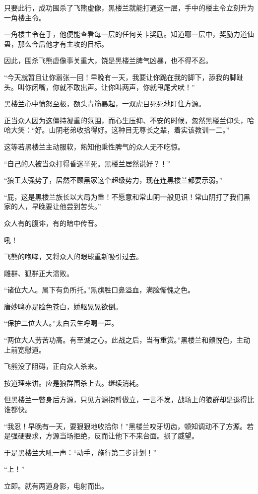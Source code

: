 \begin{this_body}
只要此行，成功围杀了飞熊虚像，黑楼兰就能打通这一层，手中的楼主令立刻升为一角楼主令。

一角楼主令在手，他便能查看每一层的任何关卡奖励。知道哪一层中，奖励力道仙蛊，那么今后他才有主攻的目标。

因此，围杀飞熊虚像事关重大，饶是黑楼兰脾气凶暴，也不得不忍。

“今天就暂且让你嚣张一回！早晚有一天，我要让你跪在我的脚下，舔我的脚趾头。叫你闭嘴，你就不敢出声。让你叫两声，你就甩尾犬吠！”

黑楼兰心中愤怒至极，额头青筋暴起，一双虎目死死地盯住方源。

正当众人因为这僵持凝重的氛围，而心生压抑、不安的时候，忽然黑楼兰仰头，哈哈大笑：“好。山阴老弟收拾得好。这种目无尊长之辈，着实该教训一二。”

这等若黑楼兰主动服软，熟知他秉性脾气的众人无不吃惊。

“自己的人被当众打得昏迷半死。黑楼兰居然说好？！”

“狼王太强势了，居然不顾黑家这个超级势力，现在连黑楼兰都要示弱。”

“屁，这是黑楼兰族长以大局为重！不愿意和常山阴一般见识！常山阴打了我们黑家的人，早晚要让他尝到苦头。”

众人有的腹诽，有的暗中传音。

吼！

飞熊的咆哮，又将众人的眼球重新吸引过去。

雕群、狐群正大溃败。

“诸位大人。属下有负所托。”黑旗胜口鼻溢血，满脸惭愧之色。

唐妙鸣亦是脸色苍白，娇躯晃晃欲倒。

“保护二位大人。”太白云生呼喝一声。

“两位大人劳苦功高。有至诚之心。此战之后，当有重赏。”黑楼兰和颜悦色，主动上前宽慰道。

飞熊没了阻碍，正向众人杀来。

按道理来讲。应是狼群围杀上去。继续消耗。

但黑楼兰一瞥身后方源，只见方源抱臂傲立，一言不发，战场上的狼群却是退得比谁都快。

“我忍！早晚有一天，要狠狠地收拾你！”黑楼兰咬牙切齿，顿知调动不了方源。若是强硬要求，方源当场拒绝，反而让他下不来台面。损了威望。

于是黑楼兰大吼一声：“动手，施行第二步计划！”

“上！”

立即。就有两道身影，电射而出。


\end{this_body}
